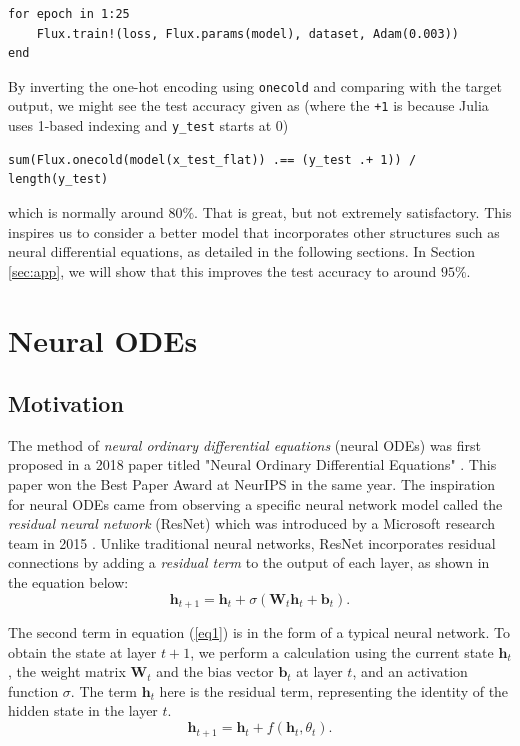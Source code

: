 \documentclass[a4paper,11pt,titlepage]{article}
\theoremstyle{definition}
\theoremstyle{plain}
\theoremstyle{remark}
\begin{document}
\begin{verbatim}
for epoch in 1:25
    Flux.train!(loss, Flux.params(model), dataset, Adam(0.003))
end
\end{verbatim}

By inverting the one-hot encoding using \verb|onecold| and comparing with the target output, we might see the test accuracy given as (where the \verb|+1| is because Julia uses 1-based indexing and \verb|y_test| starts at 0)

\begin{verbatim}
sum(Flux.onecold(model(x_test_flat)) .== (y_test .+ 1)) / length(y_test)
\end{verbatim}

which is normally around $80\%$.  That is great, but not extremely satisfactory. This inspires us to consider a better model that incorporates other structures such as neural differential equations, as detailed in the following sections. In Section \ref{sec:app}, we will show that this improves the test accuracy to around $95\%$.

\pagebreak
\section{Neural ODEs}
\label{sec:intro}

\subsection{Motivation}

The method of \textit{neural ordinary differential equations} (neural ODEs) was first proposed in a 2018 paper titled "Neural Ordinary Differential Equations" \cite{chen2018neural}. This paper won the Best Paper Award at NeurIPS in the same year. The inspiration for neural ODEs came from observing a specific neural network model called the \textit{residual neural network} (ResNet) which was introduced by a Microsoft research team in 2015 \cite{he2016deep}. Unlike traditional neural networks, ResNet incorporates residual connections by adding a \textit{residual term} to the output of each layer, as shown in the equation below:
\begin{equation}\label{eq1}
    \textbf{h}_{t+1} = \textbf{h}_t + \sigma\left(\textbf{W}_t\textbf{h}_t + \textbf{b}_t\right).
\end{equation}

The second term in equation (\ref{eq1}) is in the form of a typical neural network. To obtain the state at layer $t+1$, we perform a calculation using the current state $\textbf{h}_t$, the weight matrix $\textbf{W}_t$ and the bias vector $\textbf{b}_t$ at layer $t$, and an activation function $\sigma$. The term $\textbf{h}_t$ here is the residual term, representing the identity of the hidden state in the layer $t$.
\begin{equation}\label{eq2}
    \textbf{h}_{t+1} = \textbf{h}_t + f\left(\textbf{h}_t, \theta_t\right).
\end{equation}
\end{document}
